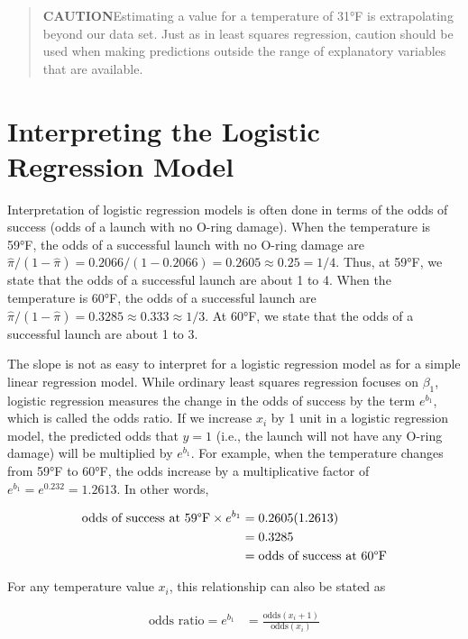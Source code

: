 \documentclass[
]{book}
\begin{document}
\begin{quote}
\textbf{CAUTION}Estimating a value for a temperature of 31°F is extrapolating beyond our data set. Just as in least squares regression, caution should be used when making predictions outside the range of explanatory variables that are available.
\end{quote}

\hypertarget{interpreting-the-logistic-regression-model}{%
\section{Interpreting the Logistic Regression Model}\label{interpreting-the-logistic-regression-model}}

Interpretation of logistic regression models is often done in terms of the odds of success (odds of a launch with no O-ring damage). When the temperature is 59°F, the odds of a successful launch with no O-ring damage are \(\hat\pi/(1 - \hat\pi) = 0.2066/(1 - 0.2066) = 0.2605 \approx 0.25 = 1/4\). Thus, at 59°F, we state that the odds of a successful launch are about 1 to 4. When the temperature is 60°F, the odds of a successful launch are \(\hat\pi/(1 - \hat\pi) = 0.3285 \approx 0.333 \approx 1/3\). At 60°F, we state that the odds of a successful launch are about 1 to 3.

The slope is not as easy to interpret for a logistic regression model as for a simple linear regression model. While ordinary least squares regression focuses on \(\beta_1\), logistic regression measures the change in the odds of success by the term \(e^{b_1}\), which is called the odds ratio. If we increase \(x_i\) by 1 unit in a logistic regression model, the predicted odds that \(y = 1\) (i.e., the launch will not have any O-ring damage) will be multiplied by \(e^{b_1}\). For example, when the temperature changes from 59°F to 60°F, the odds increase by a multiplicative factor of \(e^{b_1} = e^{0.232} = 1.2613\). In other words,

\begin{align}
\text{odds of success at 59°F} \times e^{b_1} 
&= 0.2605(1.2613) \notag \\
&= 0.3285 \notag \\
&= \text{odds of success at 60°F} \notag
\end{align}

For any temperature value \(x_i\), this relationship can also be stated as

\begin{align}
\text{odds ratio} = e^{b_1} &= \frac{\text{odds}(x_i + 1)}{\text{odds}(x_i)} \tag{6.10}
\end{align}
\end{document}
